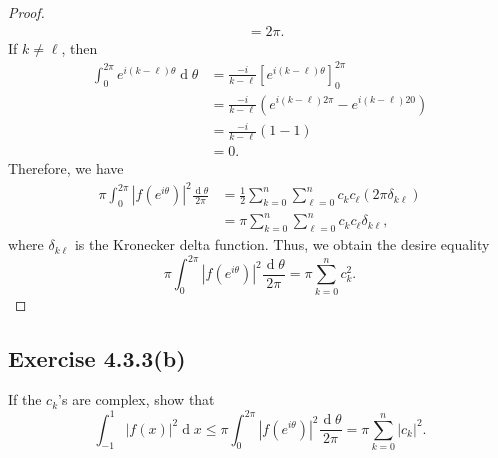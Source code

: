 \documentclass[12pt]{article}
\newenvironment{problem}
    {\begin{lrbox}{\mybox}\begin{minipage}{0.98\textwidth}}
    {\end{minipage}\end{lrbox}\framebox[\textwidth]{\usebox{\mybox}}}
\newcommand{\<}{\left\langle} %
\renewcommand{\>}{\right\rangle} %
\renewcommand{\d}[1]{\operatorname{d}\!#1} %
\begin{document}
\begin{proof}
\begin{align*}
            &= 2\pi.
    \end{align*}
    If $k \ne \ell$, then
    \begin{align*}
        \int_0^{2\pi} e^{i(k - \ell)\theta} \d{\theta}
            &= \frac{-i}{k-\ell} \left[ e^{i(k - \ell)\theta} \right]_0^{2\pi} \\[1em]
            &= \frac{-i}{k-\ell} \left( e^{i(k - \ell)2\pi} - e^{i(k - \ell)20} \right) \\[1em]
            &= \frac{-i}{k-\ell} \left( 1 - 1 \right) \\[1em]
            &= 0.
    \end{align*}
    Therefore, we have
    \begin{align*}
        \pi \int_0^{2\pi} |f(e^{i\theta})|^2 \frac{\d{\theta}}{2\pi}
            &= \frac12 \sum_{k=0}^n \sum_{\ell=0}^n c_kc_\ell (2\pi \delta_{k\ell}) \\[1em]
            &= \pi \sum_{k=0}^n \sum_{\ell=0}^n c_kc_\ell \delta_{k\ell},
    \end{align*}
    where $\delta_{k\ell}$ is the Kronecker delta function. Thus, we obtain the desire equality
    \[\pi \int_0^{2\pi} |f(e^{i\theta})|^2 \frac{\d{\theta}}{2\pi}= \pi \sum_{k=0}^n c_k^2.\]
    
\end{proof}

\newpage
\subsection*{Exercise 4.3.3(b)}
\begin{problem}
    If the $c_k$'s are complex, show that
    \[\int_{-1}^1 |f(x)|^2 \d{x}  \leq \pi \int_0^{2\pi}|f(e^{i\theta})|^2 \frac{\d{\theta}}{2\pi} = \pi \sum_{k=0}^n|c_k|^2.\]
\end{problem}
\end{document}
